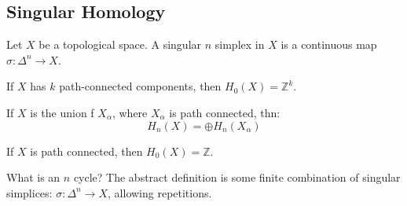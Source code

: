 \documentclass[crop=false,class=book,oneside]{standalone}
\begin{document}
            \subsection{Singular Homology}
                Let $X$ be a topological space. A
                singular $n$ simplex in $X$ is a continuous map
                $\sigma:\Delta^{n}\rightarrow{X}$.
                \begin{theorem}
                    If $X$ has $k$ path-connected components, then
                    $H_{0}(X)=\mathbb{Z}^{k}$.
                \end{theorem}
                \begin{theorem}
                    If $X$ is the union f $X_{\alpha}$, where
                    $X_{\alpha}$ is path connected, thn:
                    \begin{equation}
                        H_{n}(X)=\oplus{H}_{n}(X_{\alpha})
                    \end{equation}
                \end{theorem}
                \begin{theorem}
                    If $X$ is path connected, then
                    $H_{0}(X)=\mathbb{Z}$.
                \end{theorem}
                What is an $n$ cycle? The abstract definition
                is some finite combination of singular simplices:
                $\sigma:\Delta^{n}\rightarrow{X}$, allowing
                repetitions.
\end{document}
